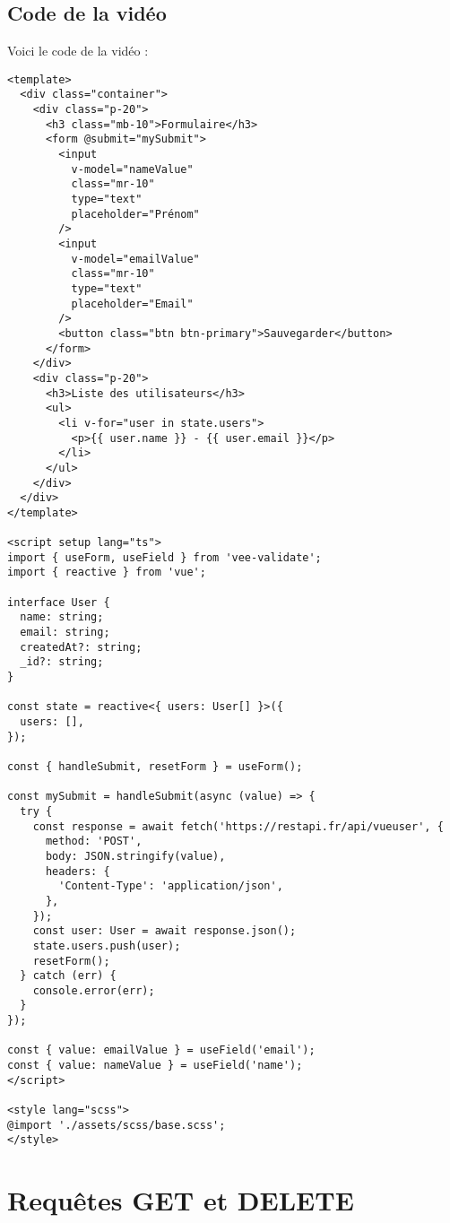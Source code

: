 \subsection{Code de la vidéo}
Voici le code de la vidéo :
\begin{verbatim}
<template>
  <div class="container">
    <div class="p-20">
      <h3 class="mb-10">Formulaire</h3>
      <form @submit="mySubmit">
        <input
          v-model="nameValue"
          class="mr-10"
          type="text"
          placeholder="Prénom"
        />
        <input
          v-model="emailValue"
          class="mr-10"
          type="text"
          placeholder="Email"
        />
        <button class="btn btn-primary">Sauvegarder</button>
      </form>
    </div>
    <div class="p-20">
      <h3>Liste des utilisateurs</h3>
      <ul>
        <li v-for="user in state.users">
          <p>{{ user.name }} - {{ user.email }}</p>
        </li>
      </ul>
    </div>
  </div>
</template>

<script setup lang="ts">
import { useForm, useField } from 'vee-validate';
import { reactive } from 'vue';

interface User {
  name: string;
  email: string;
  createdAt?: string;
  _id?: string;
}

const state = reactive<{ users: User[] }>({
  users: [],
});

const { handleSubmit, resetForm } = useForm();

const mySubmit = handleSubmit(async (value) => {
  try {
    const response = await fetch('https://restapi.fr/api/vueuser', {
      method: 'POST',
      body: JSON.stringify(value),
      headers: {
        'Content-Type': 'application/json',
      },
    });
    const user: User = await response.json();
    state.users.push(user);
    resetForm();
  } catch (err) {
    console.error(err);
  }
});

const { value: emailValue } = useField('email');
const { value: nameValue } = useField('name');
</script>

<style lang="scss">
@import './assets/scss/base.scss';
</style>
\end{verbatim}


\section{Requêtes GET et DELETE}
